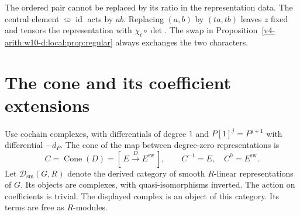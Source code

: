 The ordered pair cannot be replaced by its ratio in the representation data.
The central element $\varpi\operatorname{id}$ acts by $ab$.
Replacing $(a,b)$ by $(ta,tb)$ leaves $z$ fixed and tensors the representation
with $\chi_t\circ\det$.
The swap in Proposition~\ref{v4-arith:w10-d:local:prop:regular} always exchanges the two characters.

\section{The cone and its coefficient extensions}

Use cochain complexes, with differentials of degree $1$ and
$P[1]^j=P^{j+1}$ with differential $-d_P$.
The cone of the map between degree-zero representations is
\[
 C=\operatorname{Cone}(D)=
 [\,E\xrightarrow{D}E^\mathrm{sw}\,],
 \qquad C^{-1}=E,\quad C^0=E^\mathrm{sw}.
\]
Let $\mathcal D_{\mathrm{sm}}(G,R)$ denote the derived category of smooth
$R$-linear representations of $G$.
Its objects are complexes, with quasi-isomorphisms inverted.
The action on coefficients is trivial.
The displayed complex is an object of this category.
Its terms are free as $R$-modules.

